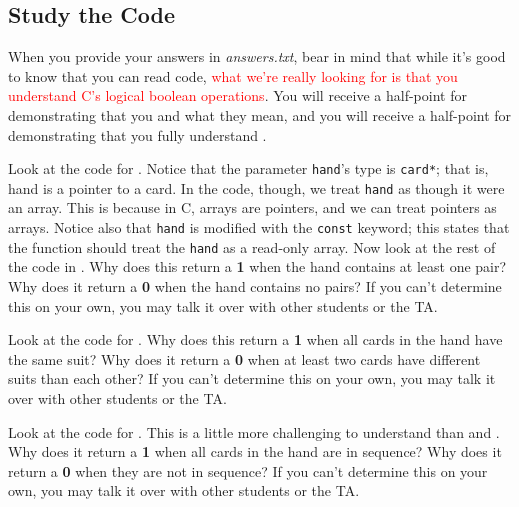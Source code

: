 \subsection{Study the Code} \label{subsec:studythecode}

When you provide your answers in \textit{answers.txt}, bear in mind that while it's good to know that you can read code, \textcolor{red}{what we're really looking for is that you understand C's logical boolean operations}.
You will receive a half-point for demonstrating that you  and what they mean,
and you will receive a half-point for demonstrating that you fully understand .

Look at the code for .
Notice that the parameter \lstinline{hand}'s type is \lstinline{card*};
that is, \lstinline{}{hand} is a pointer to a \lstinline{}{card}.
In the code, though, we treat \lstinline{hand} as though it were an array.
This is because in C, arrays are pointers, and we can treat pointers as arrays.
Notice also that \lstinline{hand} is modified with the \lstinline{const} keyword;
this states that the  function should treat the \lstinline{hand} as a read-only array.
Now look at the rest of the code in .
Why does this return a \textbf{1} when the hand contains at least one pair?
Why does it return a \textbf{0} when the hand contains no pairs?
If you can't determine this on your own, you may talk it over with other students or the TA\@.
\begin{description}
\end{description}

Look at the code for .
Why does this return a \textbf{1} when all cards in the hand have the same suit?
Why does it return a \textbf{0} when at least two cards have different suits than each other?
If you can't determine this on your own, you may talk it over with other students or the TA\@.
\begin{description}
\end{description}

Look at the code for .
This is a little more challenging to understand than  and .
Why does it return a \textbf{1} when all cards in the hand are in sequence?
Why does it return a \textbf{0} when they are not in sequence?
If you can't determine this on your own, you may talk it over with other students or the TA\@.
\begin{description}
\end{description}

